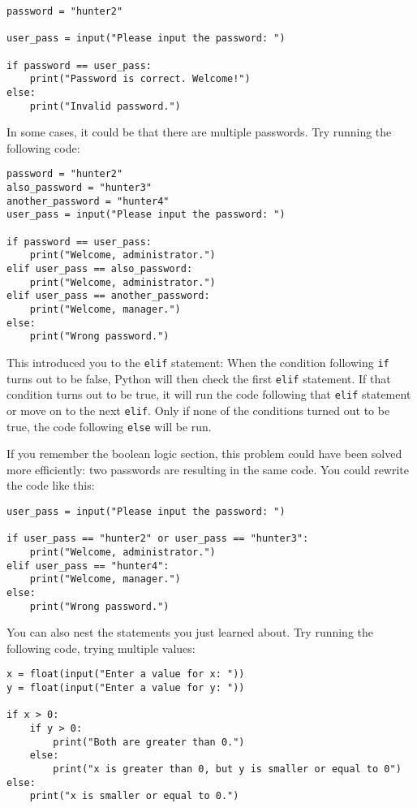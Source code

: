 \documentclass[11pt,hidelinks]{article}
\begin{document}
\begin{lstlisting}[style=python]
password = "hunter2"

user_pass = input("Please input the password: ")

if password == user_pass:
    print("Password is correct. Welcome!")
else:
    print("Invalid password.")
\end{lstlisting}

In some cases, it could be that there are multiple passwords. Try running the
following code:
\begin{lstlisting}
password = "hunter2"
also_password = "hunter3"
another_password = "hunter4"
user_pass = input("Please input the password: ")

if password == user_pass:
    print("Welcome, administrator.")
elif user_pass == also_password:
    print("Welcome, administrator.")
elif user_pass == another_password:
    print("Welcome, manager.")
else:
    print("Wrong password.")
\end{lstlisting}

This introduced you to the \lstinline!elif! statement: When the condition
following \lstinline!if! turns out to be false, Python will then check the first
\lstinline!elif! statement. If that condition turns out to be true, it will run
the code following that \lstinline!elif! statement or move on to the next
\lstinline!elif!. Only if none of the conditions turned out to be true, the code
following \lstinline!else! will be run.

If you remember the boolean logic section, this problem could have been solved
more efficiently: two passwords are resulting in the same code. You could
rewrite the code like this:
\begin{lstlisting}
user_pass = input("Please input the password: ")

if user_pass == "hunter2" or user_pass == "hunter3":
    print("Welcome, administrator.")
elif user_pass == "hunter4":
    print("Welcome, manager.")
else:
    print("Wrong password.")
\end{lstlisting}

You can also nest the statements you just learned about. Try running the
following code, trying multiple values:
\begin{lstlisting}
x = float(input("Enter a value for x: "))
y = float(input("Enter a value for y: "))

if x > 0:
    if y > 0:
        print("Both are greater than 0.")
    else:
        print("x is greater than 0, but y is smaller or equal to 0")
else:
    print("x is smaller or equal to 0.")
\end{lstlisting}
\end{document}
